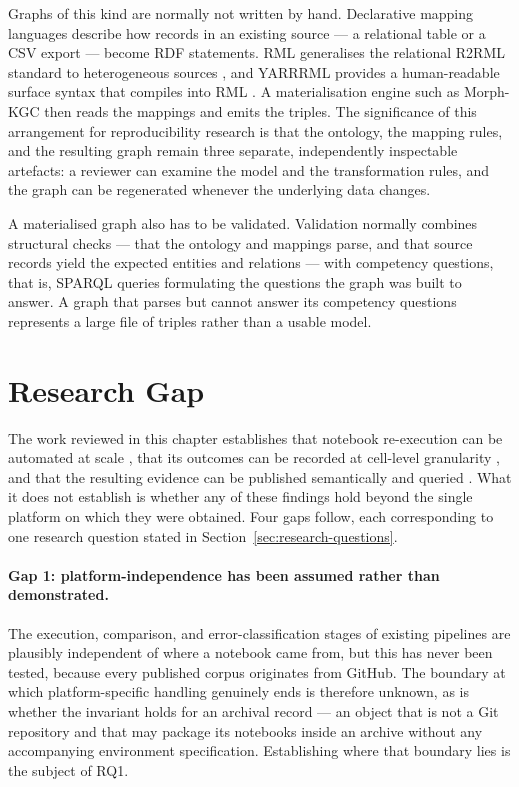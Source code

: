 Graphs of this kind are normally not written by hand. Declarative mapping languages describe how records in an existing source --- a relational table or a CSV export --- become RDF statements. RML generalises the relational R2RML standard to heterogeneous sources \cite{rmlspec}, and YARRRML provides a human-readable surface syntax that compiles into RML \cite{heyvaert2018yarrrml}. A materialisation engine such as Morph-KGC \cite{arenas2024morph} then reads the mappings and emits the triples. The significance of this arrangement for reproducibility research is that the ontology, the mapping rules, and the resulting graph remain three separate, independently inspectable artefacts: a reviewer can examine the model and the transformation rules, and the graph can be regenerated whenever the underlying data changes.

A materialised graph also has to be validated. Validation normally combines structural checks --- that the ontology and mappings parse, and that source records yield the expected entities and relations --- with competency questions, that is, SPARQL queries formulating the questions the graph was built to answer. A graph that parses but cannot answer its competency questions represents a large file of triples rather than a usable model.

\clearpage
\section{Research Gap}
\label{sec:research-gap}

The work reviewed in this chapter establishes that notebook re-execution can be automated at scale \cite{pimentel2019,samuel2024computational}, that its outcomes can be recorded at cell-level granularity \cite{samuel2024computational}, and that the resulting evidence can be published semantically and queried \cite{samuel2024fairjupyter}. What it does not establish is whether any of these findings hold beyond the single platform on which they were obtained. Four gaps follow, each corresponding to one research question stated in Section~\ref{sec:research-questions}.

\paragraph{Gap 1: platform-independence has been assumed rather than demonstrated.} The execution, comparison, and error-classification stages of existing pipelines are plausibly independent of where a notebook came from, but this has never been tested, because every published corpus originates from GitHub. The boundary at which platform-specific handling genuinely ends is therefore unknown, as is whether the invariant holds for an archival record --- an object that is not a Git repository and that may package its notebooks inside an archive without any accompanying environment specification. Establishing where that boundary lies is the subject of RQ1.


